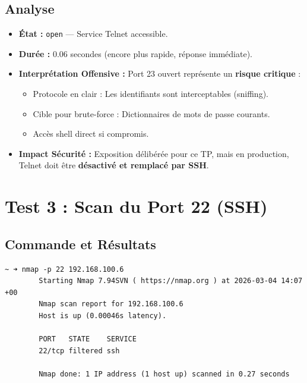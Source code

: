 \documentclass[12pt,a4paper,openany]{report}
\begin{document}
	\subsection{Analyse}
	\begin{itemize}
		\item \textbf{État :} \texttt{open} --- Service Telnet accessible.
		\item \textbf{Durée :} 0.06 secondes (encore plus rapide, réponse immédiate).
		\item \textbf{Interprétation Offensive :} Port 23 ouvert représente un \textbf{risque critique} :
		\begin{itemize}
			\item Protocole en clair : Les identifiants sont interceptables (sniffing).
			\item Cible pour brute-force : Dictionnaires de mots de passe courants.
			\item Accès shell direct si compromis.
		\end{itemize}
		\item \textbf{Impact Sécurité :} Exposition délibérée pour ce TP, mais en production, Telnet doit être \textbf{désactivé et remplacé par SSH}.
	\end{itemize}
	
	\section{Test 3 : Scan du Port 22 (SSH)}
	\subsection{Commande et Résultats}
	\begin{lstlisting}[caption=Scan Nmap du port SSH (non forwardé)]
		~ ➜ nmap -p 22 192.168.100.6
		Starting Nmap 7.94SVN ( https://nmap.org ) at 2026-03-04 14:07 +00
		Nmap scan report for 192.168.100.6
		Host is up (0.00046s latency).
		
		PORT   STATE    SERVICE
		22/tcp filtered ssh
		
		Nmap done: 1 IP address (1 host up) scanned in 0.27 seconds
	\end{lstlisting}
	
\end{document}
